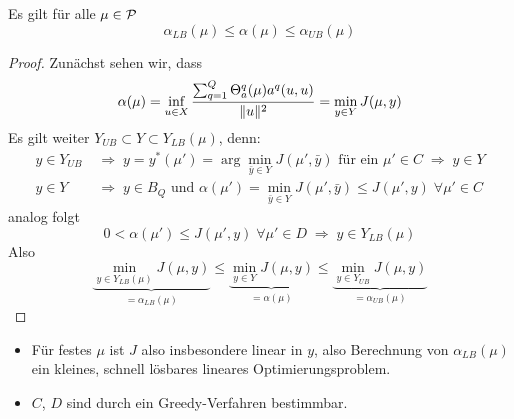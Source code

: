 \begin{satz}
	Es gilt für alle $\mu \in \mathcal{P}$
	\[
		\alpha_{LB}(\mu) \leq \alpha(\mu) \leq \alpha_{UB}(\mu)
	\]

	\begin{proof}
		Zunächst sehen wir, dass
		\[
			\alpha(\mu) = \inf_{u \in X} \frac{\sum_{q=1}^Q \Theta_a^q(\mu) a^q(u,u)}{\|u\|^2} = \min_{y \in Y} J(\mu,y)
		\]
		Es gilt weiter $Y_{UB} \subset Y \subset Y_{LB}(\mu)$, denn:
		\begin{align*}
			y \in Y_{UB} \; &\Rightarrow \; y = y^*(\mu') = \arg\min_{\bar y \in Y} J(\mu',\bar y) \text{ für ein } \mu' \in C \; \Rightarrow \; y \in Y\\
			y \in Y \; &\Rightarrow \; y \in B_Q \text{ und } \alpha(\mu') = \min_{\bar y \in Y} J(\mu',\bar y) \leq J(\mu',y) \; \forall \mu' \in C
		\end{align*}
		analog folgt
		\[
			0 < \alpha(\mu') \leq J(\mu',y) \; \forall \mu' \in D \; \Rightarrow \; y \in Y_{LB}(\mu)
		\]
		Also
		\[
			\underbrace{\min_{y \in Y_{LB}(\mu)} J(\mu,y)}_{= \alpha_{LB}(\mu)} \leq \underbrace{\min_{y \in Y} J(\mu,y)}_{= \alpha(\mu)} \leq \underbrace{\min_{y \in Y_{UB}} J(\mu,y)}_{= \alpha_{UB}(\mu)}
		\]
	\end{proof}
\end{satz}

\begin{bem} \beginwithlistbem
	\begin{itemize}
		\item Für festes $\mu$ ist $J$ also insbesondere linear in $y$, also Berechnung von $\alpha_{LB}(\mu)$ ein kleines, schnell lösbares lineares Optimierungsproblem.
		\item $C$, $D$ sind durch ein Greedy-Verfahren bestimmbar.
	\end{itemize}
\end{bem}
